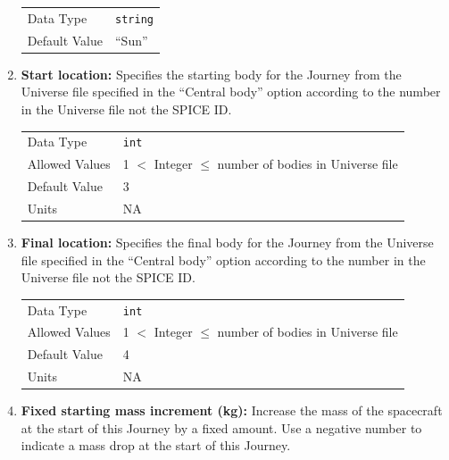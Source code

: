 \begin{enumerate}
        \begin{table}[H]
            \hspace{2cm}
            \begin{tabular}{ll}
            Data Type & \verb|string| \\
            Default Value & ``Sun'' \\
            \end{tabular}
        \end{table}


    \item \textbf{Start location:} Specifies the starting body for the Journey from the Universe file specified in the ``Central body'' option according to the number in the Universe file not the \ac{SPICE} ID.
    
        \begin{table}[H]
            \hspace{2cm}
            \begin{tabular}{ll}
            Data Type & \verb|int| \\
            Allowed Values & 1 $<$ Integer $\leq$ number of bodies in Universe file \\
            Default Value & 3 \\
            Units & NA
            \end{tabular}
        \end{table}

    \item \textbf{Final location:} Specifies the final body for the Journey from the Universe file specified in the ``Central body'' option according to the number in the Universe file not the \ac{SPICE} ID.
    
        \begin{table}[H]
            \hspace{2cm}
            \begin{tabular}{ll}
            Data Type & \verb|int| \\
            Allowed Values & 1 $<$ Integer $\leq$ number of bodies in Universe file \\
            Default Value & 4 \\
            Units & NA
            \end{tabular}
        \end{table}

    \item \textbf{Fixed starting mass increment (kg):} Increase the mass of the spacecraft at the start of this Journey by a fixed amount. Use a negative number to indicate a mass drop at the start of this Journey. 
    

\end{enumerate}
